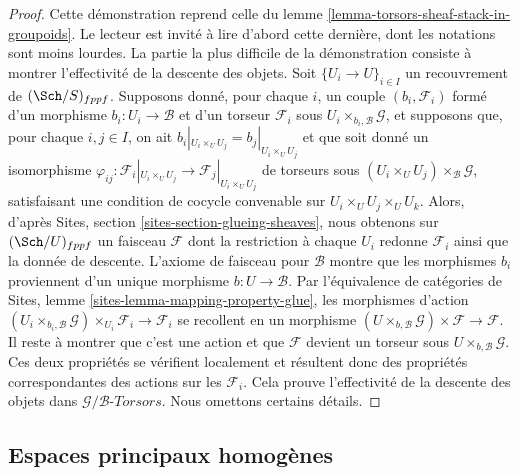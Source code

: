 \begin{proof}
Cette démonstration reprend celle du
lemme \ref{lemma-torsors-sheaf-stack-in-groupoids}.
Le lecteur est invité à lire d'abord cette dernière, dont
les notations sont moins lourdes.
La partie la plus difficile de la démonstration consiste à montrer
l'effectivité de la descente des objets. Soit $\{U_i \to U\}_{i \in I}$
un recouvrement de $(\Sch/S)_{fppf}$.
Supposons donné, pour chaque $i$, un couple $(b_i, \mathcal{F}_i)$
formé d'un morphisme $b_i : U_i \to \mathcal{B}$ et d'un
torseur $\mathcal{F}_i$ sous $U_i \times_{b_i, \mathcal{B}} \mathcal{G}$,
et supposons que, pour chaque $i, j \in I$,
on ait $b_i|_{U_i \times_U U_j} = b_j|_{U_i \times_U U_j}$ et
que soit donné un isomorphisme
$\varphi_{ij} :
\mathcal{F}_i|_{U_i \times_U U_j} \to \mathcal{F}_j|_{U_i \times_U U_j}$
de torseurs sous $(U_i \times_U U_j) \times_\mathcal{B} \mathcal{G}$,
satisfaisant une condition de cocycle convenable sur $U_i \times_U U_j \times_U U_k$.
Alors, d'après
Sites, section \ref{sites-section-glueing-sheaves},
nous obtenons sur $(\Sch/U)_{fppf}$ un faisceau $\mathcal{F}$
dont la restriction à chaque $U_i$ redonne $\mathcal{F}_i$ ainsi que
la donnée de descente. L'axiome de faisceau pour $\mathcal{B}$ montre
que les morphismes $b_i$ proviennent d'un unique morphisme $b : U \to \mathcal{B}$.
Par l'équivalence de catégories de
Sites, lemme \ref{sites-lemma-mapping-property-glue},
les morphismes d'action
$(U_i \times_{b_i, \mathcal{B}} \mathcal{G}) \times_{U_i} \mathcal{F}_i
\to \mathcal{F}_i$
se recollent en un morphisme
$(U \times_{b, \mathcal{B}} \mathcal{G}) \times \mathcal{F} \to \mathcal{F}$.
Il reste à montrer que c'est une action et que $\mathcal{F}$ devient
un torseur sous $U \times_{b, \mathcal{B}} \mathcal{G}$.
Ces deux propriétés se vérifient localement
et résultent donc des propriétés correspondantes des actions
sur les $\mathcal{F}_i$.
Cela prouve l'effectivité de la descente des objets dans
$\mathcal{G}/\mathcal{B}\textit{-Torsors}$.
Nous omettons certains détails.
\end{proof}



\subsection{Espaces principaux homogènes}
\label{subsection-principal-homogeneous-spaces}

